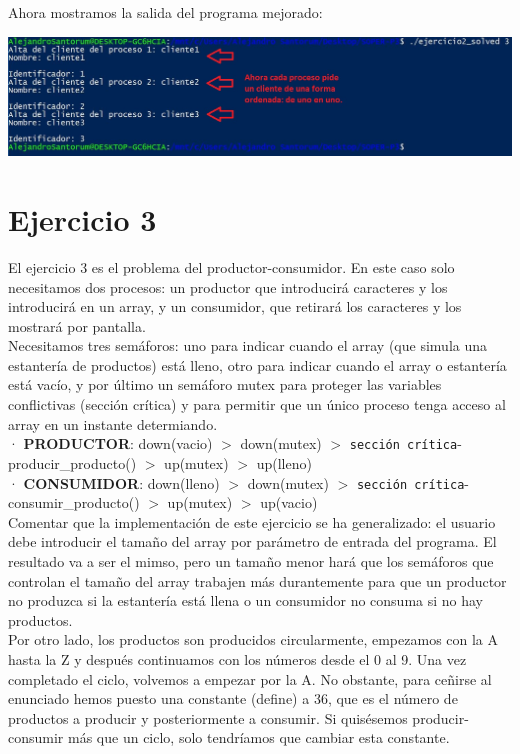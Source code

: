 \documentclass[12pt]{article}
\begin{document}
Ahora mostramos la salida del programa mejorado:
\begin{center}
	\includegraphics[scale=0.86]{ej2_solved.JPG}
\end{center}


\section{Ejercicio 3}
El ejercicio 3 es el problema del productor-consumidor. En este caso solo necesitamos dos procesos: un productor que introducirá caracteres y los introducirá en un array, y un consumidor, que retirará los caracteres y los mostrará por pantalla.\\

Necesitamos tres semáforos: uno para indicar cuando el array (que simula una estantería de productos) está lleno, otro para indicar cuando el array o estantería está vacío, y por último un semáforo mutex para proteger las variables conflictivas (sección crítica) y para permitir que un único proceso tenga acceso al array en un instante determiando.\\

· \textbf{PRODUCTOR}: down(vacio) $>$ down(mutex) $>$ \texttt{sección crítica}-producir\_producto() $>$ up(mutex) $>$ up(lleno)\\

· \textbf{CONSUMIDOR}: down(lleno) $>$ down(mutex) $>$ \texttt{sección crítica}-consumir\_producto() $>$ up(mutex) $>$ up(vacio)\\

Comentar que la implementación de este ejercicio se ha generalizado: el usuario debe introducir el tamaño del array por parámetro de entrada del programa. El resultado va a ser el mimso, pero un tamaño menor hará que los semáforos que controlan el tamaño del array trabajen más durantemente para que un productor no produzca si la estantería está llena o un consumidor no consuma si no hay productos.\\ Por otro lado, los productos son producidos circularmente, empezamos con la A hasta la Z y después continuamos con los números desde el 0 al 9. Una vez completado el ciclo, volvemos a empezar por la A. No obstante, para ceñirse al enunciado hemos puesto una constante (define) a 36, que es el número de productos a producir y posteriormente a consumir. Si quisésemos producir-consumir más que un ciclo, solo tendríamos que cambiar esta constante.\\
\end{document}
